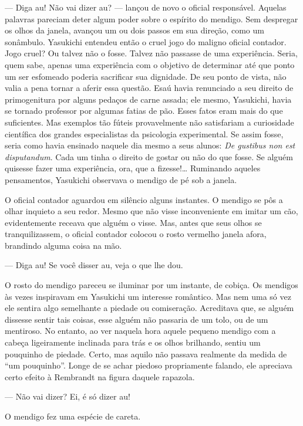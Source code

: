 --- Diga au! Não vai dizer au? --- lançou de novo o oficial responsável.
Aquelas palavras pareciam deter algum poder sobre o espírito do
mendigo. Sem despregar os olhos da janela, avançou um ou dois passos em
sua direção, como um sonâmbulo. Yasukichi entendeu então o cruel jogo
do maligno oficial contador. Jogo cruel? Ou talvez não o fosse. Talvez
não passasse de uma experiência. Seria, quem sabe, apenas uma
experiência com o objetivo de determinar até que ponto um ser esfomeado
poderia sacrificar sua dignidade. De seu ponto de vista, não valia a
pena tornar a aferir essa questão. Esaú havia renunciado a seu direito
de primogenitura por alguns pedaços de carne assada; ele mesmo,
Yasukichi, havia se tornado professor por algumas fatias de pão. Esses
fatos eram mais do que suficientes. Mas exemplos tão fúteis
provavelmente não satisfariam a curiosidade científica dos grandes
especialistas da psicologia experimental. Se assim fosse, seria como
havia ensinado naquele dia mesmo a seus alunos: \textit{De gustibus 
non est disputandum}. Cada um tinha o direito de gostar ou
não do que fosse. Se alguém quisesse fazer uma experiência, ora, que a
fizesse!\ldots{} Ruminando aqueles pensamentos, Yasukichi observava o
mendigo de pé sob a janela.

O oficial contador aguardou em silêncio alguns instantes. O mendigo se
pôs a olhar inquieto a seu redor. Mesmo que não visse inconveniente em
imitar um cão, evidentemente receava que alguém o visse. Mas, antes que
seus olhos se tranquilizassem, o oficial contador colocou o rosto
vermelho janela afora, brandindo alguma coisa na mão.

--- Diga au! Se você disser au, veja o que lhe dou.

O rosto do mendigo pareceu se iluminar por um instante, de cobiça. Os
mendigos às vezes inspiravam em Yasukichi um interesse romântico. Mas
nem uma só vez ele sentira algo semelhante a piedade ou comiseração.
Acreditava que, se alguém dissesse sentir tais coisas, esse alguém não
passaria de um tolo, ou de um mentiroso. No entanto, ao ver naquela
hora aquele pequeno mendigo com a cabeça ligeiramente inclinada para
trás e os olhos brilhando, sentiu um pouquinho de piedade. Certo, mas
aquilo não passava realmente da medida de ``um pouquinho''. Longe de se
achar piedoso propriamente falando, ele apreciava certo efeito à
Rembrandt na figura daquele rapazola.

--- Não vai dizer? Ei, é só dizer au!

O mendigo fez uma espécie de careta.


